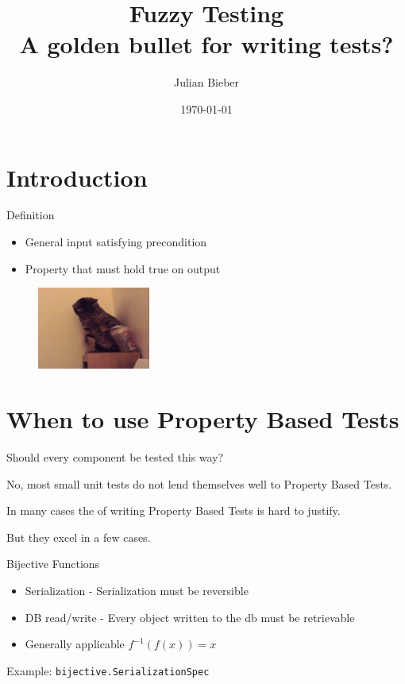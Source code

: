 \documentclass[xcolor=svgnames,handout]{beamer}
\title
[Fuzzy Testing \hspace{2em}]
{Fuzzy Testing \\ A golden bullet for writing tests?}
\author
[Julian Bieber]
{Julian Bieber}
\date
{\today}
\begin{document}
    \maketitle

    \section
    {Introduction}

    \begin{frame}
    {Definition}
        \begin{itemize}
            \item General input satisfying precondition
            \item Property that must hold true on output
        \end{itemize}
        \begin{figure}[ht]
        \centering
        \includegraphics[width=0.33\textwidth]{cat-10.png}
        \end{figure}

    \end{frame}


    \section
    {When to use Property Based Tests}

    \begin{frame}
    {Should every component be tested this way?}

        No, most small unit tests do not lend themselves well to Property Based Tests.

        In many cases the of writing Property Based Tests is hard to justify.

        But they excel in a few cases.
    \end{frame}


    \begin{frame}
    {Bijective Functions}
        \begin{itemize}
            \item Serialization - Serialization must be reversible
            \item DB read/write - Every object written to the db must be retrievable
            \item Generally applicable $f^{-1}(f(x)) = x$
        \end{itemize}

        Example: \texttt{bijective.SerializationSpec}
    \end{frame}
\end{document}
